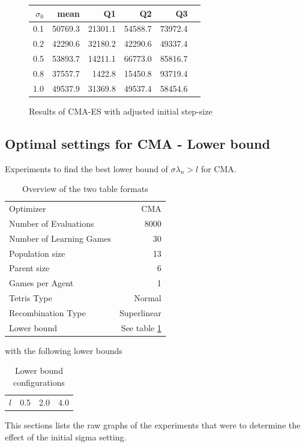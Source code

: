 \begin{figure}[H]
\centering
\begin{tabular}{r | r r r r r}
$\sigma_0$ & mean & Q1 & Q2 & Q3\\
\hline
0.1 & 50769.3 & 21301.1 & 54588.7 & 73972.4\\
0.2 & 42290.6 & 32180.2 & 42290.6 & 49337.4\\
0.5 & 53893.7 & 14211.1 & 66773.0 & 85816.7\\
0.8 & 37557.7 & 1422.8  & 15450.8 & 93719.4\\
1.0 & 49537.9 & 31369.8 & 49537.4 & 58454.6
\end{tabular}
\caption{Results of CMA-ES with adjusted initial step-size \label{CMAInitialSigmaConfigTestAppendix}}
\end{figure}


\clearpage

\subsection{Optimal settings for CMA - Lower bound \label{appendixCMALowerBound}}
Experiments to find the best lower bound of $\sigma \lambda_n > l$ for CMA.

\begin{table}[h]
\centering
\caption{Overview of the two table formats}
\begin{tabular}{l r}
Optimizer & CMA\\
Number of Evaluations & 8000\\
Number of Learning Games &30\\
Population size& 13\\
Parent size & 6\\
Games per Agent & 1\\
Tetris Type & Normal\\
\hline
Recombination Type & Superlinear\\
Lower bound & See table \ref{appendixLowerBound}
\end{tabular}
\end{table}

with the following lower bounds

\begin{table}[H]
\centering
\begin{tabular}{c | c c c}
$l$ & 0.5 & 2.0 & 4.0
\end{tabular}
\caption{Lower bound configurations \label{appendixLowerBound}}
\end{table}
This sections lists the raw graphs of the experiments that were
to determine the effect of the initial sigma setting. 

